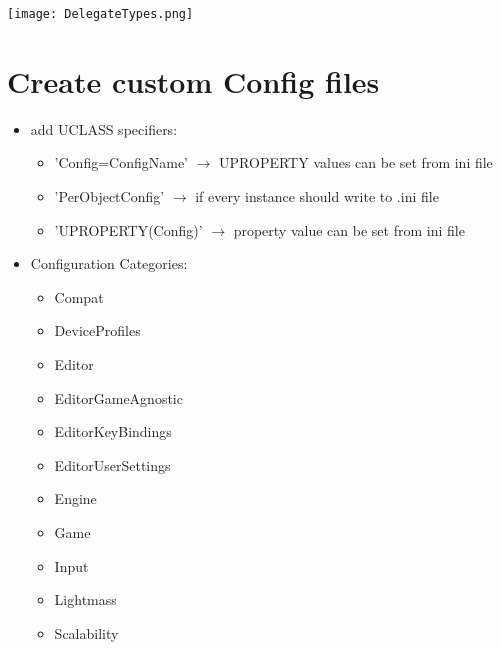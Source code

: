         \texttt{[image: DelegateTypes.png]}

    \section{Create custom Config files}
        \begin{itemize}
            \item add UCLASS specifiers:
            \begin{itemize}
                \item 'Config=ConfigName' $\rightarrow$ UPROPERTY values can be set from ini file
                \item 'PerObjectConfig' $\rightarrow$ if every instance should write to .ini file 
                \item 'UPROPERTY(Config)' $\rightarrow$ property value can be set from ini file
            \end{itemize}
            \item Configuration Categories:
            \begin{itemize}
                \item Compat
                \item DeviceProfiles
                \item Editor
                \item EditorGameAgnostic
                \item EditorKeyBindings
                \item EditorUserSettings
                \item Engine
                \item Game
                \item Input
                \item Lightmass
                \item Scalability
            \end{itemize}
        \end{itemize}

